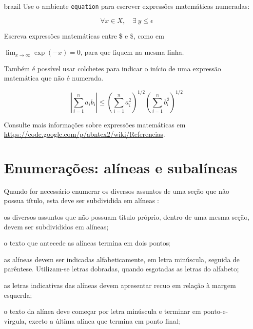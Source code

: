 \begin{otherlanguage*}{brazil}
 Use o ambiente \texttt{equation} para escrever
expressões matemáticas numeradas:

\begin{equation}
  \forall x \in X, \quad \exists \: y \leq \epsilon
\end{equation}

Escreva expressões matemáticas entre \$ e \$, como em

 $\lim_{x \to \infty}
\exp(-x) = 0 $, para que fiquem na mesma linha.

Também é possível usar colchetes para indicar o início de uma expressão
matemática que não é numerada.

\[
\left|\sum_{i=1}^n a_ib_i\right|
\le
\left(\sum_{i=1}^n a_i^2\right)^{1/2}
\left(\sum_{i=1}^n b_i^2\right)^{1/2}
\]

Consulte mais informações sobre expressões matemáticas em
\url{https://code.google.com/p/abntex2/wiki/Referencias}.






\section{Enumerações: alíneas e subalíneas}

Quando for necessário enumerar
os diversos assuntos de uma seção que não possua título, esta deve ser
subdividida em alíneas \cite[4.2]{NBR6024:2012}:

\begin{alineas}

  \item os diversos assuntos que não possuam título próprio, dentro de uma mesma
  seção, devem ser subdivididos em alíneas;

  \item o texto que antecede as alíneas termina em dois pontos;
  \item as alíneas devem ser indicadas alfabeticamente, em letra minúscula,
  seguida de parêntese. Utilizam-se letras dobradas, quando esgotadas as
  letras do alfabeto;

  \item as letras indicativas das alíneas devem apresentar recuo em relação à
  margem esquerda;

  \item o texto da alínea deve começar por letra minúscula e terminar em
  ponto-e-vírgula, exceto a última alínea que termina em ponto final;


\end{alineas}
\end{otherlanguage*}
